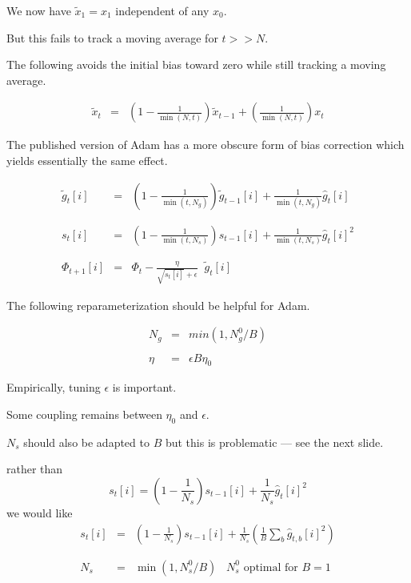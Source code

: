 {\vfill
We now have $\tilde{x}_1 = x_1$ independent of any $x_0$.

\vfill
But this fails to track a moving average for $t >> N$.


The following avoids the initial bias toward zero while still tracking a moving average.

\begin{eqnarray*}
\tilde{x}_t & = & \left(1-\frac{1}{\min(N,t)}\right)\tilde{x}_{t-1} + \left(\frac{1}{\min(N,t)}\right)x_t
\end{eqnarray*}

\vfill
The published version of Adam has a more obscure form of bias correction which yields essentially the same effect.


\begin{eqnarray*}
  \tilde{g}_{t}[i] & = & \left(1-\frac{1}{\min(t,N_g)}\right)\tilde{g}_{t-1}[i] + \frac{1}{\min(t,N_g)} \hat{g}_t[i] \\
  \\
  \\
  s_{t}[i] & = & \left(1-\frac{1}{\min(t,N_s)}\right)s_{t-1}[i] + \frac{1}{\min(t,N_s)} \hat{g}_t[i]^2 \\
  \\
  \\
\Phi_{t+1}[i] & =  & \Phi_t - \frac{\eta}{\sqrt{s_{t}[i]} + \epsilon}\;\;\tilde{g}_{t}[i]
\end{eqnarray*}


The following reparameterization should be helpful for Adam.

\begin{eqnarray*}
N_g & = & min(1,N^0_g/B) \\
\\
\eta & = & \epsilon B \eta_0
\end{eqnarray*}

\vfill
Empirically, tuning $\epsilon$ is important.

\vfill
Some coupling remains between $\eta_0$ and $\epsilon$.

\vfill
$N_s$ should also be adapted to $B$ but this is problematic --- see the next slide.


rather than
$$s_t[i] = \left(1-\frac{1}{N_s}\right) s_{t-1}[i] + \frac{1}{N_s} \hat{g}_t[i]^2$$
\vfill
we would like
\begin{eqnarray*}
s_t[i] & = &  \left(1-\frac{1}{N_s}\right) s_{t-1}[i] + \frac{1}{N_s} \left(\frac{1}{B} \sum_b \hat{g}_{t,b}[i]^2\right) \\
\\
\\
N_s & = & \min\left(1,N^0_s/B\right)\;\;\;\mbox{$N^0_s$ optimal for $B=1$}
\end{eqnarray*}

}
